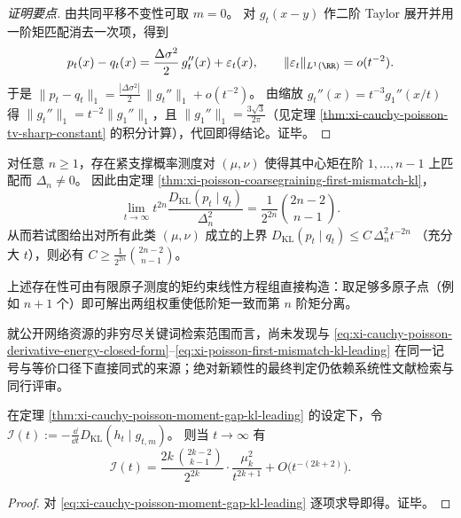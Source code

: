 \begin{proof}[证明要点]
由共同平移不变性可取 \(m=0\)。
对 \(g_t(x-y)\) 作二阶 Taylor 展开并用一阶矩匹配消去一次项，得到
\[
p_t(x)-q_t(x)=\frac{\Delta\sigma^2}{2}\,g_t''(x)+\varepsilon_t(x),
\qquad \|\varepsilon_t\|_{L^1(\RR)}=o(t^{-2}).
\]
于是
\(
\|p_t-q_t\|_{1}=\frac{|\Delta\sigma^2|}{2}\,\|g_t''\|_{1}+o(t^{-2})
\)。
由缩放 \(g_t''(x)=t^{-3}g_1''(x/t)\) 得 \(\|g_t''\|_1=t^{-2}\|g_1''\|_1\)，且 \(\|g_1''\|_1=\frac{3\sqrt3}{2\pi}\)（见定理 \ref{thm:xi-cauchy-poisson-tv-sharp-constant} 的积分计算），代回即得结论。证毕。
\end{proof}

\begin{remark}[常数的最优性与构造性例子]\label{rem:xi-poisson-first-mismatch-optimality}
对任意 \(n\ge 1\)，存在紧支撑概率测度对 \((\mu,\nu)\) 使得其中心矩在阶 \(1,\dots,n-1\) 上匹配而 \(\Delta_n\neq 0\)。
因此由定理 \ref{thm:xi-poisson-coarsegraining-first-mismatch-kl}，
\[
\lim_{t\to\infty}t^{2n}\frac{D_{\mathrm{KL}}(p_t\mid q_t)}{\Delta_n^2}
=\frac{1}{2^{2n}}\binom{2n-2}{n-1}.
\]
从而若试图给出对所有此类 \((\mu,\nu)\) 成立的上界
\(
D_{\mathrm{KL}}(p_t\mid q_t)\le C\,\Delta_n^2 t^{-2n}
\)
（充分大 \(t\)），则必有
\(
C\ge \frac{1}{2^{2n}}\binom{2n-2}{n-1}
\)。
\par
上述存在性可由有限原子测度的矩约束线性方程组直接构造：取足够多原子点（例如 \(n+1\) 个）即可解出两组权重使低阶矩一致而第 \(n\) 阶矩分离。
\end{remark}

\begin{remark}[文献对照]\label{rem:xi-poisson-first-mismatch-literature-contrast}
就公开网络资源的非穷尽关键词检索范围而言，尚未发现与
\eqref{eq:xi-cauchy-poisson-derivative-energy-closed-form}--\eqref{eq:xi-poisson-first-mismatch-kl-leading}
在同一记号与等价口径下直接同式的来源；绝对新颖性的最终判定仍依赖系统性文献检索与同行评审。
\end{remark}

\begin{corollary}[缺口阶的耗散尾部常数]\label{cor:xi-cauchy-poisson-moment-gap-dissipation}
在定理 \ref{thm:xi-cauchy-poisson-moment-gap-kl-leading} 的设定下，令
\(
\mathcal I(t):=-\frac{\dd}{\dd t}D_{\mathrm{KL}}(h_t\mid g_{t,m})
\)。
则当 \(t\to\infty\) 有
\begin{equation}\label{eq:xi-cauchy-poisson-moment-gap-dissipation}
\boxed{\;
\mathcal I(t)
=\frac{2k\,\binom{2k-2}{k-1}}{2^{2k}}\cdot\frac{\mu_k^2}{t^{2k+1}}
+O\!\bigl(t^{-(2k+2)}\bigr).\;}
\end{equation}
\end{corollary}

\begin{proof}
对 \eqref{eq:xi-cauchy-poisson-moment-gap-kl-leading} 逐项求导即得。证毕。
\end{proof}

\endinput
